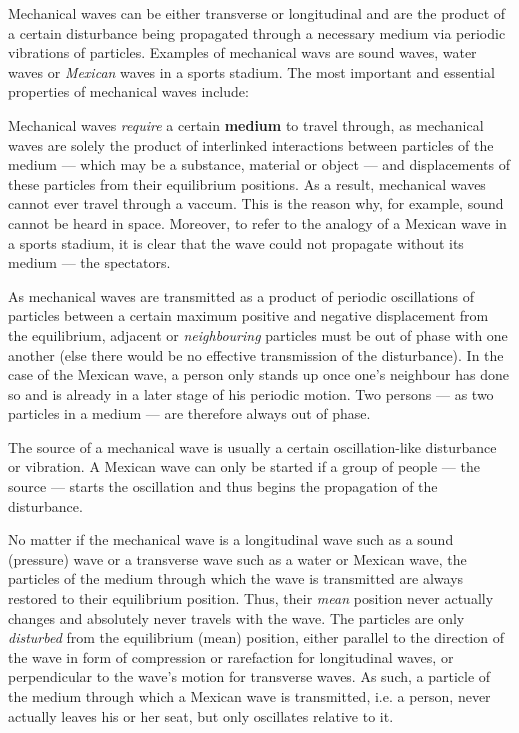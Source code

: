 
Mechanical waves can be either transverse or longitudinal and are the product of a certain disturbance being propagated through a necessary medium via periodic vibrations of particles. Examples of mechanical wavs are sound waves, water waves or \emph{Mexican} waves in a sports stadium. The most important and essential properties of mechanical waves include:

\begin{itemize}


	Mechanical waves \emph{require} a certain \textbf{medium} to travel through, as mechanical waves are solely the product of interlinked interactions between particles of the medium --- which may be a substance, material or object --- and displacements of these particles from their equilibrium positions. As a result, mechanical waves cannot ever travel through a vaccum. This is the reason why, for example, sound cannot be heard in space. Moreover, to refer to the analogy of a Mexican wave in a sports stadium, it is clear that the wave could not propagate without its medium --- the spectators.


	As mechanical waves are transmitted as a product of periodic oscillations of particles between a certain maximum positive and negative displacement from the equilibrium, adjacent or \emph{neighbouring} particles must be out of phase with one another (else there would be no effective transmission of the disturbance). In the case of the Mexican wave, a person only stands up once one's neighbour has done so and is already in a later stage of his periodic motion. Two persons --- as two particles in a medium --- are therefore always out of phase.


	The source of a mechanical wave is usually a certain oscillation-like disturbance or vibration. A Mexican wave can only be started if a group of people --- the source --- starts the oscillation and thus begins the propagation of the disturbance.


	No matter if the mechanical wave is a longitudinal wave such as a sound (pressure) wave or a transverse wave such as a water or Mexican wave, the particles of the medium through which the wave is transmitted are always restored to their equilibrium position. Thus, their \emph{mean} position never actually changes and absolutely never travels with the wave. The particles are only \emph{disturbed} from the equilibrium (mean) position, either parallel to the direction of the wave in form of compression or rarefaction for longitudinal waves, or perpendicular to the wave's motion for transverse waves. As such, a particle of the medium through which a Mexican wave is transmitted, i.e. a person, never actually leaves his or her seat, but only oscillates relative to it.


\end{itemize}

